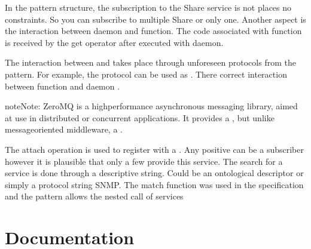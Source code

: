 \documentclass[a4paper,10pt,english,openany,oneside]{sphinxmanual}
\begin{document}
In the pattern structure, the subscription to the Share service is not
places no constraints. So you can subscribe to multiple Share or only one.
Another aspect is the interaction between daemon and function. The code associated with function is received by
the get operator  after executed with daemon.

The interaction between  and  takes place through unforeseen protocols
from the pattern. For example, the protocol can be used as . There
correct interaction between function and daemon .

\begin{sphinxadmonition}{note}{Note:}
ZeroMQ is a high\sphinxhyphen{}performance asynchronous messaging library,
aimed at use in distributed or concurrent applications. It provides a , but
unlike message\sphinxhyphen{}oriented middleware, a .
\end{sphinxadmonition}

The attach operation is used to register with a . Any positive can be a subscriber however it is plausible that only a few provide
this service. The search for a service is done through a descriptive string.
Could be an ontological descriptor or simply a protocol  string
SNMP. The match function was used in the specification and the pattern allows the nested call of services


\chapter{Documentation}
\label{\detokenize{documentation:documentation}}\label{\detokenize{documentation::doc}}\begin{quote}

\begin{footnote}[1]\sphinxAtStartFootnote
{}
%
\end{footnote}
\end{quote}
\end{document}
